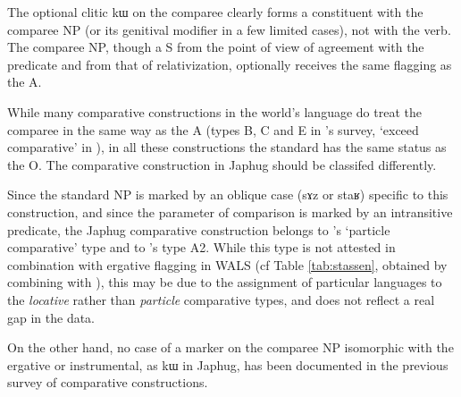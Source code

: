 \documentclass[oldfontcommands,oneside,a4paper,11pt]{article}
\newcommand{\ipa}[1]{{\phon #1}} %
\begin{document}
The optional clitic \ipa{kɯ} on the comparee  clearly forms a constituent with the comparee NP (or its genitival modifier in a few limited cases), not with the verb. The comparee NP, though a S from the point of view of agreement with the predicate and from that of relativization, optionally receives  the same flagging as the A.

 
While many comparative constructions in the world's language do treat the comparee in the same way as the A (types B, C and E in \citealt[789]{dixon08comparative}'s survey, `exceed comparative' in  \citealt{stassen11comparative}), in all these constructions the standard has the same status as the O.  The comparative construction in Japhug should be classifed differently. 

Since the standard NP is marked by an oblique case (\ipa{sɤz} or \ipa{staʁ}) specific to this construction, and since the parameter of comparison is marked by an intransitive predicate, the Japhug comparative construction belongs to  \citet{stassen11comparative}'s `particle comparative' type and to \citealt[789]{dixon08comparative}'s type A2.  While this type is not attested in combination with  ergative flagging in WALS (cf Table \ref{tab:stassen}, obtained by combining \citealt{stassen11comparative} with \citealt{comrie11case}), this may be due to the assignment of particular languages to the \textit{locative} rather than \textit{particle}  comparative types, and does not reflect a real gap in the data.

On the other hand, no case of a marker   on the comparee NP isomorphic with the ergative or instrumental, as \ipa{kɯ} in Japhug, has been documented in the previous survey of comparative constructions.

\begin{table}[h]
\caption{Combination of chapters 98 (Alignment of Case Marking of Full Nouns) and 121 (Comparative constructions) of the WALS} \label{tab:stassen}
\end{table}
 
\end{document}
